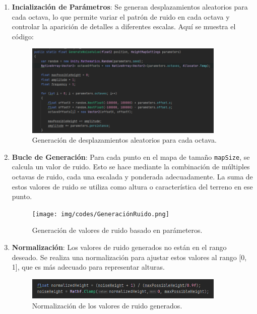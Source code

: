 \begin{enumerate}
    \item \textbf{Incialización de Parámetros}: Se generan desplazamientos aleatorios para cada octava, lo que permite variar el patrón de ruido en cada octava y controlar la aparición de detalles a diferentes escalas.
    Aquí se muestra el código:
    \begin{figure}[h]
        \centering
        \includegraphics[width=0.9\textwidth]{img/codes/octavas.png}
        \caption{Generación de desplazamientos aleatorios para cada octava.}
    \end{figure}
    
    \item \textbf{Bucle de Generación}: Para cada punto en el mapa de tamaño \texttt{mapSize}, se calcula un valor de ruido. Esto se hace mediante la combinación de múltiples octavas de ruido, cada una escalada y ponderada adecuadamente. La suma de estos valores de ruido se utiliza como altura o característica del terreno en ese punto.
    \begin{figure}[h]
        \centering
        \texttt{[image: img/codes/GeneraciónRuido.png]}
        \caption{Generación de valores de ruido basado en parámeteros.}
    \end{figure}
    \item \textbf{Normalización}: Los valores de ruido generados no están en el rango deseado. Se realiza una normalización para ajustar estos valores al rango [0, 1], que es más adecuado para representar alturas.
    \begin{figure}[h]
        \centering
        \includegraphics[width=0.9\textwidth]{img/codes/normalizacion.png}
        \caption{Normalización de los valores de ruido generados.}
    \end{figure}
\end{enumerate}


